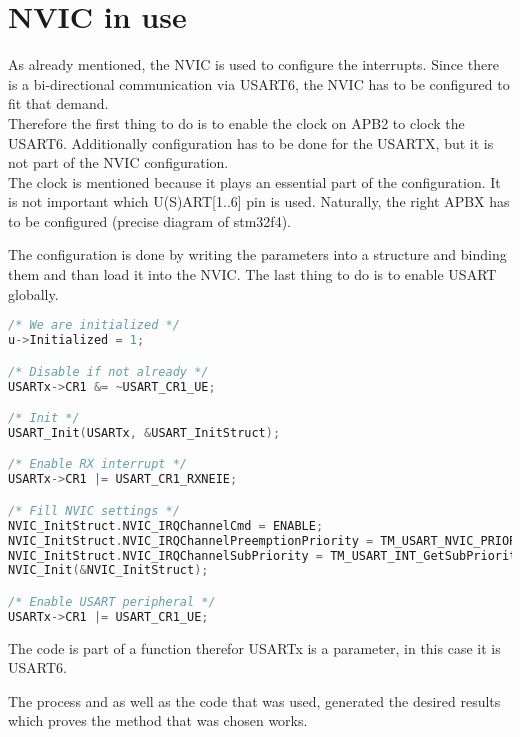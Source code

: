 \chapter{NVIC in use}
As already mentioned, the NVIC is used to configure the interrupts. Since
there is a bi-directional communication via USART6, the NVIC has to be
configured to fit that demand.\\
Therefore the first thing to do is to enable the clock on APB2 to clock
the USART6. Additionally configuration has to be done for the USARTX,
 but it is not part of the NVIC configuration.\\
The clock is mentioned because it plays an essential part of the configuration.
It is not important which U(S)ART[1..6] pin is used. Naturally, the right APBX
has to be configured (precise diagram of stm32f4).

The configuration is done by writing the parameters into a structure and
binding them and than load it into the NVIC.
The last thing to do is to enable USART globally.

\begin{lstlisting}[language=C,caption={enable usart},label=lst:usart]%[ht]
/* We are initialized */
u->Initialized = 1;

/* Disable if not already */
USARTx->CR1 &= ~USART_CR1_UE;

/* Init */
USART_Init(USARTx, &USART_InitStruct);

/* Enable RX interrupt */
USARTx->CR1 |= USART_CR1_RXNEIE;

/* Fill NVIC settings */
NVIC_InitStruct.NVIC_IRQChannelCmd = ENABLE;
NVIC_InitStruct.NVIC_IRQChannelPreemptionPriority = TM_USART_NVIC_PRIORITY;
NVIC_InitStruct.NVIC_IRQChannelSubPriority = TM_USART_INT_GetSubPriority(USARTx);
NVIC_Init(&NVIC_InitStruct);

/* Enable USART peripheral */
USARTx->CR1 |= USART_CR1_UE;
\end{lstlisting}

The code is part of a function therefor USARTx is a parameter, in this case it
is USART6.

The process and as well as the code that was used, generated the desired results
 which proves the method that was chosen works.


